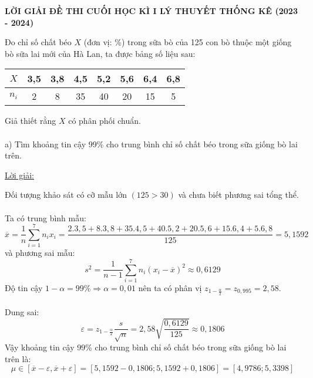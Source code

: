 \documentclass[10pt, a4paper]{article}
\begin{document}
	\pagestyle{fancy}
	\fancyhead{} %
	\fancyfoot{} %
	\fancyfoot[C]{\textbf\thepage}
	\renewcommand{\headrulewidth}{0.6pt}
	\renewcommand{\footrulewidth}{0.6pt}
\begin{center}
	\textbf{\color{purple}LỜI GIẢI ĐỀ THI CUỐI HỌC KÌ I LÝ THUYẾT THỐNG KÊ (2023 - 2024)}
\end{center}
\vspace{1mm}
\begin{tcolorbox}[enhanced,colback=blue!5!white,colframe=blue!75!black,sharp corners=all,shadow={0mm}{0mm}{-1.5mm}%
{fill=blue!75!red,opacity=0.3},title=\textbf{Bài 1}]
Đo chỉ số chất béo $X$ (đơn vị: \%) trong sữa bò của 125 con bò thuộc một giống bò sữa lai mới của Hà Lan, ta được bảng số liệu sau:\begin{center}
\begin{tabular}{c|c|c|c|c|c|c|c}
	$X$&3,5&3,8&4,5&5,2&5,6&6,4&6,8\\ \hline
	$n_i$&2&8&35&40&20&15&5
\end{tabular}
\end{center}
Giả thiết rằng $X$ có phân phối chuẩn.\\\\
\color{red}a) \color{black}Tìm khoảng tin cậy 99\% cho trung bình chỉ số chất béo trong sữa giống bò lai trên.
\end{tcolorbox}
\begin{center}
	\color{blue}\underline{Lời giải:}
\end{center}
Đối tượng khảo sát có cỡ mẫu lớn $(125>30)$ và chưa biết phương sai tổng thể.\\\\
Ta có trung bình mẫu: $$\overline x=\frac1n\sum_{i=1}^7n_ix_i=\frac{2.3,5+8.3,8+35.4,5+40.5,2+20.5,6+15.6,4+5.6,8}{125}=5,1592$$
và phương sai mẫu: $$s^2=\frac{1}{n-1}\sum_{i=1}^7n_i(x_i-\overline x)^2\approx0,6129$$
Độ tin cậy $1-\alpha=99\%\Rightarrow\alpha=0,01$ nên ta có phân vị $z_{1-\frac\alpha2}=z_{0,995}=2,58$.\\\\
Dung sai: $$\varepsilon=z_{1-\frac\alpha2}\frac{s}{\sqrt n}=2,58\sqrt{\frac{0,6129}{125}}\approx0,1806$$
Vậy khoảng tin cậy 99\% cho trung bình chỉ số chất béo trong sữa giống bò lai trên là: $$\mu\in[\overline x-\varepsilon,\overline x+\varepsilon]=[5,1592-0,1806;5,1592+0,1806]=[4,9786;5,3398]$$
\end{document}
